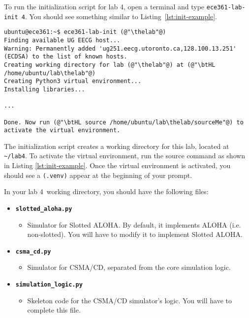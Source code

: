 \documentclass[11pt]{article}
\def\thelab{4}
\begin{document}

To run the initialization script for lab \thelab, open a terminal and type \texttt{ece361-lab-init \thelab}.
You should see something similar to Listing~\ref{lst:init-example}.

\begin{lstlisting}[style=ece361shell, caption={Initializing lab \thelab.}, label={lst:init-example}]
ubuntu@ece361:~$ ece361-lab-init (@"\thelab"@)
Finding available UG EECG host...
Warning: Permanently added 'ug251.eecg.utoronto.ca,128.100.13.251' (ECDSA) to the list of known hosts.
Creating working directory for lab (@"\thelab"@) at (@"\btHL /home/ubuntu/lab\thelab"@)
Creating Python3 virtual environment...
Installing libraries...

...

Done. Now run (@"\btHL source /home/ubuntu/lab\thelab/sourceMe"@) to activate the virtual environment.
\end{lstlisting}

The initialization script creates a working directory for this lab, located at \texttt{\textasciitilde/lab\thelab}.
To activate the virtual environment, run the source command as shown in Listing \ref{lst:init-example}.
Once the virtual environment is activated, you should see a \texttt{(.venv)} appear at the beginning of your prompt.



In your lab \thelab~working directory, you should have the following files:
\begin{itemize}
	\item \texttt{\textbf{slotted\_aloha.py}}
        \begin{itemize}
            \item Simulator for Slotted ALOHA. By default, it implements ALOHA (i.e. non-slotted). You will have to modify it to implement Slotted ALOHA.
        \end{itemize}

	\item \texttt{\textbf{csma\_cd.py}}
        \begin{itemize}
            \item Simulator for CSMA/CD, separated from the core simulation logic.
        \end{itemize}

	\item \texttt{\textbf{simulation\_logic.py}}
        \begin{itemize}
            \item Skeleton code for the CSMA/CD simulator's logic. You will have to complete this file.
        \end{itemize}
\end{itemize}
\end{document}
